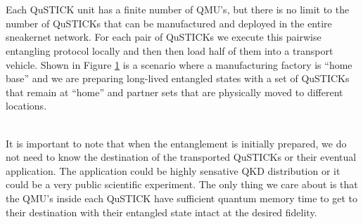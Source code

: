 \documentclass[aps,prl,twocolumn,10pt,nofootinbib]{revtex4}
\begin{document}
\\
\\
Each QuSTICK unit has a finite number of QMU's, but there is no limit to the number of QuSTICKs that can be manufactured and deployed in the entire sneakernet network.  For each pair of QuSTICKs we execute this pairwise entangling protocol locally and then then load half of them into a transport vehicle.  Shown in Figure \ref{fig:loading} is a scenario where a manufacturing factory is ``home base'' and we are preparing long-lived entangled states with a set of QuSTICKs that remain at ``home'' and partner sets that are physically moved to different locations.  
\\
\\
\begin{figure}[ht!]
	\caption{}
	\label{fig:loading}
\end{figure}
It is important to note that when the entanglement is initially prepared, we do not need to know the destination of the transported QuSTICKs or their eventual application.  The application could be highly sensative QKD distribution or it could be a very public scientific experiment.  The only thing we care about is that the QMU's inside each QuSTICK have sufficient quantum memory time to get to their destination with their entangled state intact at the desired fidelity.
\end{document}

